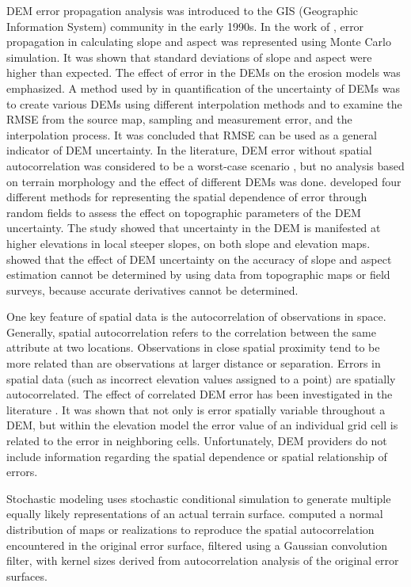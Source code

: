 \documentclass[12pt]{article}
\begin{document}
DEM error propagation analysis was introduced to the GIS 
(Geographic Information System) community in
the early 1990s.  In the work of \citet{Heuvelink1990}, error
propagation in calculating slope and aspect was represented using
Monte Carlo simulation. It was shown
that standard deviations of slope and aspect were higher than
expected.  The effect of error in the DEMs on the erosion models was
emphasized.  A method used by \citet{Qihao_Weng} in quantification of
the uncertainty of DEMs was to create various DEMs using different
interpolation methods and to examine the RMSE from the source map,
sampling and measurement error, and the interpolation process. It was
concluded that RMSE can be used as a general indicator of DEM
uncertainty.  In the literature, DEM error without spatial
autocorrelation was considered to be a worst-case scenario
\citep{Heuvelink1989, VanNiel2004, Oksanen2006}, but no analysis based
on terrain morphology and the effect of different DEMs was done.
\citet{Wechsler2006} developed four different methods for representing
the spatial dependence of error through random fields to assess the
effect on topographic parameters of the DEM uncertainty. The study
showed that uncertainty in the DEM is manifested at higher elevations
in local steeper slopes, on both slope and elevation maps.
\citet{Florinsky1998} showed that the effect of DEM uncertainty on the
accuracy of slope and aspect estimation cannot be determined by using
data from topographic maps or field surveys, because accurate
derivatives cannot be determined.

One key feature of spatial data is the autocorrelation of observations
in space.  Generally, spatial autocorrelation refers to the
correlation between the same attribute at two locations. Observations
in close spatial proximity tend to be more related than are
observations at larger distance or separation. Errors in spatial data
(such as incorrect elevation values assigned to a point) are spatially
autocorrelated. The effect of correlated DEM error has been
investigated in the literature \citep{Fisher_1991, Goodchild_1992}. It
was shown that not only is error spatially variable throughout a DEM,
but within the elevation model the error value of an individual grid
cell is related to the error in neighboring cells. Unfortunately, DEM
providers do not include information regarding the spatial dependence
or spatial relationship of errors.

Stochastic modeling uses stochastic conditional simulation to generate
multiple equally likely representations of an actual terrain
surface. \citet{Ehlschlaeger_1996, Hunter_Goodchild_1997} computed a
normal distribution of maps or realizations to reproduce the spatial
autocorrelation encountered in the original error surface, filtered
using a Gaussian convolution filter, with kernel sizes derived from
autocorrelation analysis of the original error surfaces.
\end{document}

